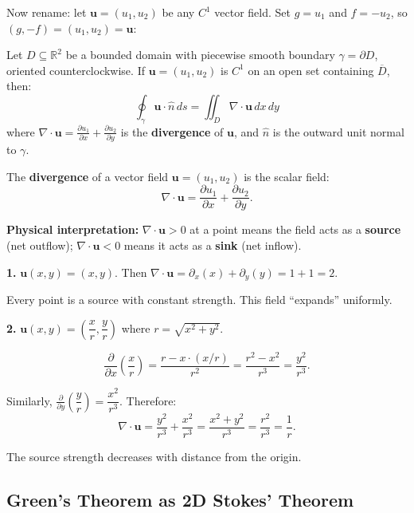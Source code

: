 \documentclass[11pt]{report}
\newcommand{\R}{\mathbb{R}}
\newcommand{\parti}[2]{\frac{\partial #1}{\partial #2}}
\begin{document}
Now rename: let $\mathbf{u} = (u_1, u_2)$ be any $C^1$ vector field. Set $g = u_1$ and $f = -u_2$, so $(g, -f) = (u_1, u_2) = \mathbf{u}$:

\begin{theorem}[Divergence Theorem in $\R^2$]
Let $D \subseteq \R^2$ be a bounded domain with piecewise smooth boundary $\gamma = \partial D$, oriented counterclockwise. If $\mathbf{u} = (u_1, u_2)$ is $C^1$ on an open set containing $\overline{D}$, then:
\[
\boxed{\oint_\gamma \mathbf{u} \cdot \hat{n} \, ds = \iint_D \nabla \cdot \mathbf{u} \, dx \, dy}
\]
where $\nabla \cdot \mathbf{u} = \parti{u_1}{x} + \parti{u_2}{y}$ is the \textbf{divergence} of $\mathbf{u}$, and $\hat{n}$ is the outward unit normal to $\gamma$.
\end{theorem}

\begin{definition}[Divergence]
The \textbf{divergence} of a vector field $\mathbf{u} = (u_1, u_2)$ is the scalar field:
\[
\nabla \cdot \mathbf{u} = \parti{u_1}{x} + \parti{u_2}{y}.
\]

\textbf{Physical interpretation:} $\nabla \cdot \mathbf{u} > 0$ at a point means the field acts as a \textbf{source} (net outflow); $\nabla \cdot \mathbf{u} < 0$ means it acts as a \textbf{sink} (net inflow).
\end{definition}

\begin{example}
\textbf{1.} $\mathbf{u}(x,y) = (x, y)$. Then $\nabla \cdot \mathbf{u} = \partial_x(x) + \partial_y(y) = 1 + 1 = 2$.

Every point is a source with constant strength. This field ``expands'' uniformly.

\textbf{2.} $\mathbf{u}(x,y) = \left(\dfrac{x}{r}, \dfrac{y}{r}\right)$ where $r = \sqrt{x^2 + y^2}$.

\[
\parti{}{x}\left( \frac{x}{r} \right) = \frac{r - x \cdot (x/r)}{r^2} = \frac{r^2 - x^2}{r^3} = \frac{y^2}{r^3}.
\]

Similarly, $\parti{}{y}\left( \dfrac{y}{r} \right) = \dfrac{x^2}{r^3}$. Therefore:
\[
\nabla \cdot \mathbf{u} = \frac{y^2}{r^3} + \frac{x^2}{r^3} = \frac{x^2 + y^2}{r^3} = \frac{r^2}{r^3} = \frac{1}{r}.
\]

The source strength decreases with distance from the origin.
\end{example}

\subsection{Green's Theorem as 2D Stokes' Theorem}
\end{document}
